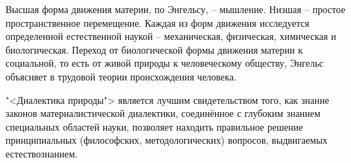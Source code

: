 \documentclass[exam_answers.tex]{subfiles}
\begin{document}
Высшая форма движения материи, по Энгельсу, – мышление.
Низшая -- простое пространственное перемещение.
Каждая из форм движения исследуется определенной естественной наукой -- механическая, физическая, химическая и биологическая.
Переход от биологической формы движения материи к социальной, то есть от живой природы к человеческому обществу, Энгельс объясняет в трудовой теории происхождения человека.

"<Диалектика природы"> является лучшим свидетельством того, как знание законов материалистической диалектики, соединённое с глубоким знанием специальных областей науки, позволяет находить правильное решение принципиальных (философских, методологических) вопросов, выдвигаемых естествознанием.
\end{document}
